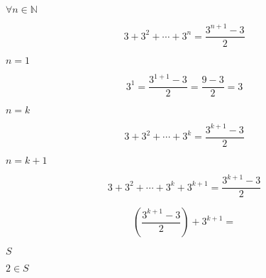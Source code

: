 \documentclass[10pt]{book}
\begin{document}
\begin{mdSnippets}
\begin{mdInlineSnippet}[775ac455dd1f9db047b23c9a57b437ac]%
$ \forall n \in \mathbb{N} $\end{mdInlineSnippet}%
\begin{mdDisplaySnippet}[7cd1e16d1f92476019233df7311bce8b]%
\[%
3 + 3^2 + \cdots + 3^n = \frac {3^{n+1} - 3} {2}
\]%
\end{mdDisplaySnippet}%
\begin{mdInlineSnippet}[ab78ccfbcd04b1ba22eb9427251cb20d]%
$n = 1$\end{mdInlineSnippet}%
\begin{mdDisplaySnippet}[a1f851db0ec848fc4d0e5a373cb2d682]%
\[%
3^1 = \frac {3^{1+1}-3} {2} = \frac {9-3} {2} = 3
\]%
\end{mdDisplaySnippet}%
\begin{mdInlineSnippet}[dc36071f824776cfcf54b119f4c1a163]%
$n = k$\end{mdInlineSnippet}%
\begin{mdDisplaySnippet}[e7a77b54672660e11e99338cf9752f92]%
\[%
3 + 3^2 + \cdots + 3^k = \frac {3^{k+1} - 3} {2}
\]%
\end{mdDisplaySnippet}%
\begin{mdInlineSnippet}[6db118b1df7f9211c7324569b51daf21]%
$n = k+1$\end{mdInlineSnippet}%
\begin{mdDisplaySnippet}%
\[%
3 + 3^2 + \cdots + 3^k + 3^{k+1}= \frac {3^{k+1} - 3} {2} 
\]%
\end{mdDisplaySnippet}%
\begin{mdDisplaySnippet}[2e6cf05ecc9806899449e04440c3b0d7]%
\[%
(\frac {3^{k+1} - 3} {2}) + 3^{k+1} = 
\]%
\end{mdDisplaySnippet}%
\begin{mdInlineSnippet}%
$S$\end{mdInlineSnippet}%
\begin{mdInlineSnippet}[ba74dc2b31a4680933b0bd1e5bcbd11a]%
$2\in S$\end{mdInlineSnippet}%

\end{mdSnippets}
\end{document}
